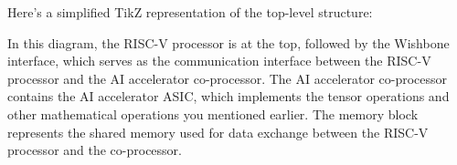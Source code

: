 \usetikzlibrary{positioning,fit,calc} %

Here's a simplified TikZ representation of the top-level structure:

\begin{center}
\end{center}

In this diagram, the RISC-V processor is at the top, followed by the Wishbone interface, which serves as the communication interface between the RISC-V processor and the AI accelerator co-processor.
The AI accelerator co-processor contains the AI accelerator ASIC, which implements the tensor operations and other mathematical operations you mentioned earlier.
The memory block represents the shared memory used for data exchange between the RISC-V processor and the co-processor.
